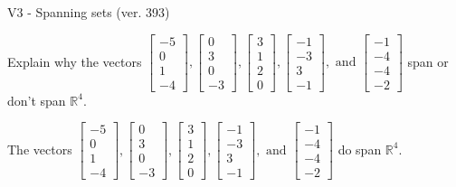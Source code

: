 \begin{exercise}
  \begin{exerciseTitle}V3 - Spanning sets (ver. 393)\end{exerciseTitle}
  \begin{exerciseStatement}
    Explain why the vectors \(\left[\begin{array}{r}
-5 \\
0 \\
1 \\
-4
\end{array}\right] , \left[\begin{array}{r}
0 \\
3 \\
0 \\
-3
\end{array}\right] , \left[\begin{array}{r}
3 \\
1 \\
2 \\
0
\end{array}\right] , \left[\begin{array}{r}
-1 \\
-3 \\
3 \\
-1
\end{array}\right] , \text{ and } \left[\begin{array}{r}
-1 \\
-4 \\
-4 \\
-2
\end{array}\right]\) span or don't span \(\mathbb{R}^4\). 
	


  \end{exerciseStatement}
  \begin{exerciseAnswer}
   The vectors \(\left[\begin{array}{r}
-5 \\
0 \\
1 \\
-4
\end{array}\right] , \left[\begin{array}{r}
0 \\
3 \\
0 \\
-3
\end{array}\right] , \left[\begin{array}{r}
3 \\
1 \\
2 \\
0
\end{array}\right] , \left[\begin{array}{r}
-1 \\
-3 \\
3 \\
-1
\end{array}\right] , \text{ and } \left[\begin{array}{r}
-1 \\
-4 \\
-4 \\
-2
\end{array}\right]\) 
  	 do  
	span \(\mathbb{R}^4\).
  



\end{exerciseAnswer}
\end{exercise}

